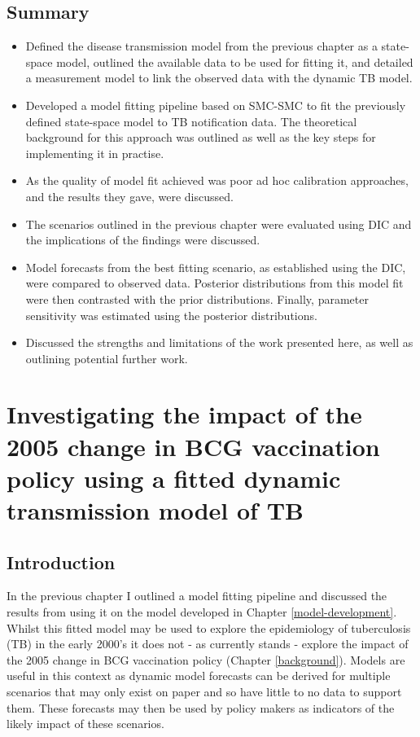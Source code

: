 \documentclass[11pt,twoside]{bristolthesis}
\providecommand{\tightlist}{%
  \setlength{\itemsep}{0pt}\setlength{\parskip}{0pt}}
\begin{document}
  \hypertarget{summary-8}{%
  \section{Summary}\label{summary-8}}
  \begin{itemize}
  \tightlist
  \item
    Defined the disease transmission model from the previous chapter as a state-space model, outlined the available data to be used for fitting it, and detailed a measurement model to link the observed data with the dynamic TB model.
  \item
    Developed a model fitting pipeline based on SMC-SMC to fit the previously defined state-space model to TB notification data. The theoretical background for this approach was outlined as well as the key steps for implementing it in practise.
  \item
    As the quality of model fit achieved was poor ad hoc calibration approaches, and the results they gave, were discussed.
  \item
    The scenarios outlined in the previous chapter were evaluated using DIC and the implications of the findings were discussed.
  \item
    Model forecasts from the best fitting scenario, as established using the DIC, were compared to observed data. Posterior distributions from this model fit were then contrasted with the prior distributions. Finally, parameter sensitivity was estimated using the posterior distributions.
  \item
    Discussed the strengths and limitations of the work presented here, as well as outlining potential further work.
  \end{itemize}
  \hypertarget{model-results}{%
  \chapter{Investigating the impact of the 2005 change in BCG vaccination policy using a fitted dynamic transmission model of TB}\label{model-results}}
  
  \hypertarget{introduction-8}{%
  \section{Introduction}\label{introduction-8}}
  
  In the previous chapter I outlined a model fitting pipeline and discussed the results from using it on the model developed in Chapter \ref{model-development}. Whilst this fitted model may be used to explore the epidemiology of tuberculosis (TB) in the early 2000's it does not - as currently stands - explore the impact of the 2005 change in BCG vaccination policy (Chapter \ref{background}). Models are useful in this context as dynamic model forecasts can be derived for multiple scenarios that may only exist on paper and so have little to no data to support them. These forecasts may then be used by policy makers as indicators of the likely impact of these scenarios.
  
\end{document}
